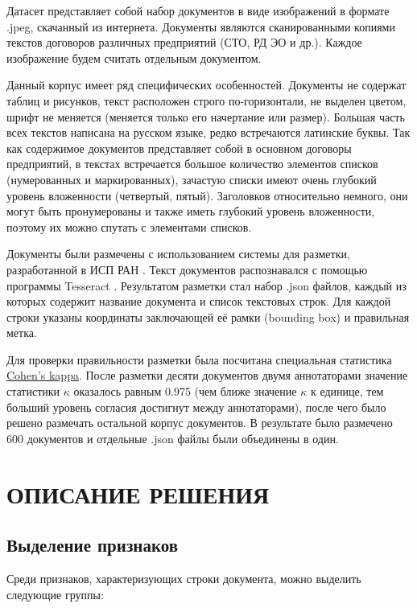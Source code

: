 \documentclass[10pt, a4paper]{ieeeconf}
\begin{document}
Датасет представляет собой набор документов в виде изображений в формате .jpeg, скачанный из интернета. Документы являются сканированными копиями текстов договоров различных предприятий (СТО, РД ЭО и др.). Каждое изображение будем считать отдельным документом.

Данный корпус имеет ряд специфических особенностей. Документы не содержат таблиц и рисунков, текст расположен строго по-горизонтали, не выделен цветом, шрифт не меняется (меняется только его начертание или размер). Большая часть всех текстов написана на русском языке, редко встречаются латинские буквы. Так как содержимое документов представляет собой в основном договоры предприятий, в текстах встречается большое количество элементов списков (нумерованных и маркированных), зачастую списки имеют очень глубокий уровень вложенности (четвертый, пятый). Заголовков относительно немного, они могут быть пронумерованы и также иметь глубокий уровень вложенности, поэтому их можно спутать с элементами списков.

Документы были размечены с использованием системы для разметки, разработанной в ИСП РАН \cite{link8}. Текст документов распознавался с помощью программы Tesseract \cite{link10}.  Результатом разметки стал набор .json файлов, каждый из которых содержит название документа и список текстовых строк. Для каждой строки указаны координаты заключающей её рамки (bounding box) и правильная метка.

Для проверки правильности разметки была посчитана специальная статистика \href{https://en.wikipedia.org/wiki/Cohen%27s_kappa}{Cohen's kappa}. После разметки десяти документов двумя аннотаторами значение статистики $\kappa$ оказалось равным 0.975 (чем ближе значение $\kappa$ к единице, тем больший уровень согласия достигнут между аннотаторами), после чего было решено размечать остальной корпус документов. В результате было размечено 600 документов и отдельные .json файлы были объединены в один.

\section{ОПИСАНИЕ РЕШЕНИЯ}

\subsection{Выделение признаков}

Среди признаков, характеризующих строки документа, можно выделить следующие группы:
\end{document}
